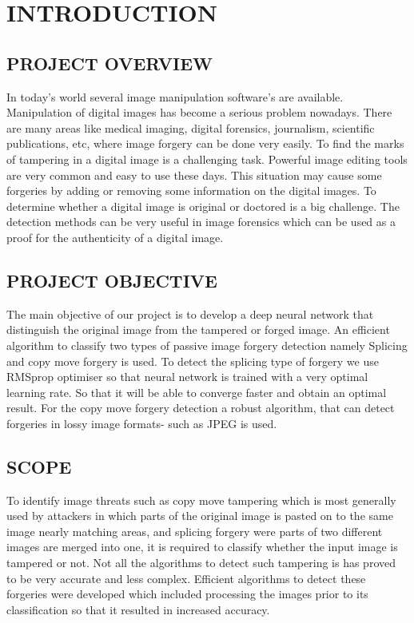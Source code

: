 \chapter{INTRODUCTION} %
\section{PROJECT OVERVIEW}
In today's world several image manipulation software's are available. Manipulation of digital images has become a serious problem nowadays. There are many areas like medical imaging, digital forensics, journalism, scientific publications, etc, where image forgery can be done very easily. To find the marks of tampering in a digital image is a challenging task. Powerful image editing tools are very common and easy to use these days. This situation may cause some forgeries by adding or removing some information on the digital images. To determine whether a digital image is original or doctored is a big challenge. The detection methods can be very useful in image forensics which can be used as a proof for the authenticity of a digital image.
\section{PROJECT OBJECTIVE}

The main objective of our project is to develop a deep neural network that distinguish the original image from the tampered or forged image. An efficient algorithm to classify two types of passive image forgery detection namely Splicing and copy move forgery is used. To detect the splicing type of forgery we use RMSprop optimiser so that neural network is trained with a very optimal learning rate. So that it will be able to converge faster and obtain an optimal result. For the copy move forgery detection a robust algorithm, that can detect forgeries in lossy image formats- such as JPEG is used.
\section{SCOPE}
To identify image threats such as copy move tampering which is most generally used by attackers in which parts of the original image is pasted on to the same image nearly matching areas, and splicing forgery were parts of two different images are merged into one, it is required to classify whether the input image is tampered or not. Not all the algorithms to detect such tampering is has proved to be very accurate and less complex. Efficient algorithms to detect these forgeries were developed which included processing the images prior to its classification so that it resulted in increased accuracy.
